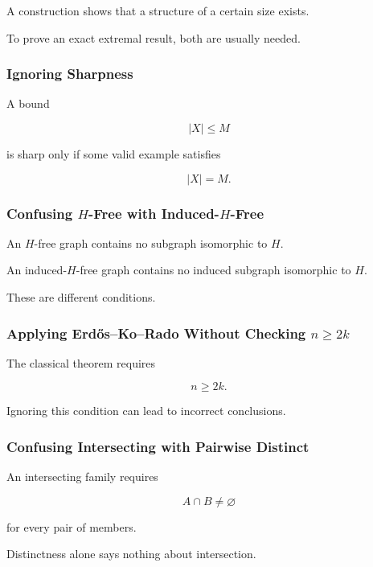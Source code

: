 A construction shows that a structure of a certain size exists.

To prove an exact extremal result, both are usually needed.

\subsubsection{Ignoring Sharpness}

A bound

\[
|X|\leq M
\]

is sharp only if some valid example satisfies

\[
|X|=M.
\]

\subsubsection{Confusing \(H\)-Free with Induced-\(H\)-Free}

An \(H\)-free graph contains no subgraph isomorphic to \(H\).

An induced-\(H\)-free graph contains no induced subgraph isomorphic to
\(H\).

These are different conditions.

\subsubsection{Applying Erd\H{o}s--Ko--Rado Without Checking \(n\geq2k\)}

The classical theorem requires

\[
n\geq2k.
\]

Ignoring this condition can lead to incorrect conclusions.

\subsubsection{Confusing Intersecting with Pairwise Distinct}

An intersecting family requires

\[
A\cap B\neq\varnothing
\]

for every pair of members.

Distinctness alone says nothing about intersection.

